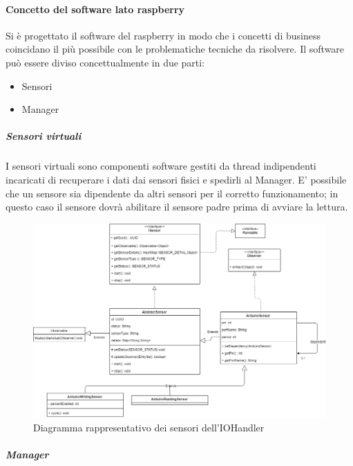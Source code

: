 \documentclass[12pt]{article}
\begin{document}
\paragraph{Concetto del software lato raspberry}
Si è progettato il software del raspberry in modo che i concetti di business coincidano il più possibile con le problematiche tecniche da risolvere.
\newpage
Il software può essere diviso concettualmente in due parti:
\begin{itemize}
\item Sensori
\item Manager
\end{itemize}
\subparagraph{Sensori virtuali}
I sensori virtuali sono componenti software gestiti da thread indipendenti incaricati di recuperare i dati dai sensori fisici e spedirli al Manager.
E' possibile che un sensore sia dipendente da altri sensori per il corretto funzionamento; in questo caso il sensore dovrà abilitare il sensore padre prima di avviare la lettura.
\begin{figure}[h!]
\centering
	\includegraphics[scale=0.43]{img/parteLocale/SoftwareSensorsRaspberry.png}  
    \caption{Diagramma rappresentativo dei sensori dell'IOHandler}
\end{figure}
\newpage
\subparagraph{Manager}
\end{document}
